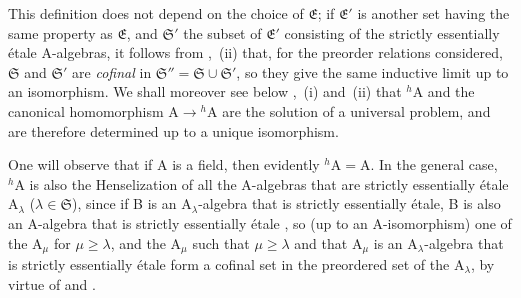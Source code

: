This definition does not depend on the choice of $\mathfrak{E}$; if $\mathfrak{E}'$ is another set having the same property as $\mathfrak{E}$, and $\mathfrak{S}'$ the subset of $\mathfrak{E}'$ consisting of the strictly essentially \'{e}tale A-algebras, it follows from ,~(ii) that, for the preorder relations considered, $\mathfrak{S}$ and $\mathfrak{S}'$ are \emph{cofinal} in $\mathfrak{S}''=\mathfrak{S}\cup\mathfrak{S}'$, so they give the same inductive limit up to an isomorphism.
We shall moreover see below ,~(i) and~(ii) that ${}^h\!\mathrm{A}$ and the canonical homomorphism $\mathrm{A}\to{}^h\!\mathrm{A}$ are the solution of a universal problem, and are therefore determined up to a unique isomorphism.

One will observe that if A is a field, then evidently ${}^h\!\mathrm{A}=\mathrm{A}$.
In the general case, ${}^h\!\mathrm{A}$ is also the Henselization of all the A-algebras that are strictly essentially \'{e}tale $\mathrm{A}_\lambda$ ($\lambda\in\mathfrak{S}$), since if B is an $\mathrm{A}_\lambda$-algebra that is strictly essentially \'{e}tale, B is also an A-algebra that is strictly essentially \'{e}tale , so (up to an A-isomorphism) one of the $\mathrm{A}_\mu$ for $\mu\geq\lambda$, and the $\mathrm{A}_\mu$ such that $\mu\geq\lambda$ and that $\mathrm{A}_\mu$ is an $\mathrm{A}_\lambda$-algebra that is strictly essentially \'{e}tale form a cofinal set in the preordered set of the $\mathrm{A}_\lambda$, by virtue of  and .

